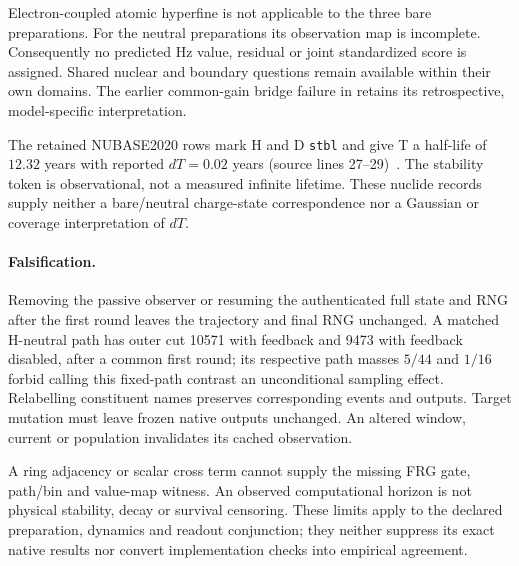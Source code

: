 Electron-coupled atomic hyperfine is not applicable to the three bare
preparations. For the neutral preparations its observation map is incomplete.
Consequently no predicted Hz value, residual or joint standardized score is
assigned. Shared nuclear and boundary questions remain available within their
own domains. The earlier common-gain bridge failure in
 retains its retrospective,
model-specific interpretation.

The retained NUBASE2020 rows mark H and D \texttt{stbl} and give T a half-life
of $12.32$ years with reported $dT=0.02$ years (source lines 27--29)~\cite{isotopes-nubase2020}.
The stability token is observational, not a measured infinite lifetime.
These nuclide records supply neither a bare/neutral charge-state correspondence
nor a Gaussian or coverage interpretation of $dT$.

\paragraph{Falsification.}
Removing the passive observer or resuming the authenticated full state and RNG
after the first round leaves the trajectory and final RNG unchanged. A matched
H-neutral path has outer cut 10571 with feedback and 9473 with feedback disabled,
after a common first round; its respective path masses $5/44$ and $1/16$ forbid
calling this fixed-path contrast an unconditional sampling effect. Relabelling
constituent names preserves corresponding events and outputs.
Target mutation must leave frozen native outputs unchanged. An altered window,
current or population invalidates its cached observation.

A ring adjacency or scalar cross term cannot supply the missing FRG gate,
path/bin and value-map witness. An observed computational horizon is not
physical stability, decay or survival censoring. These limits apply to the
declared preparation, dynamics and readout conjunction; they neither suppress
its exact native results nor convert implementation checks into empirical
agreement.

